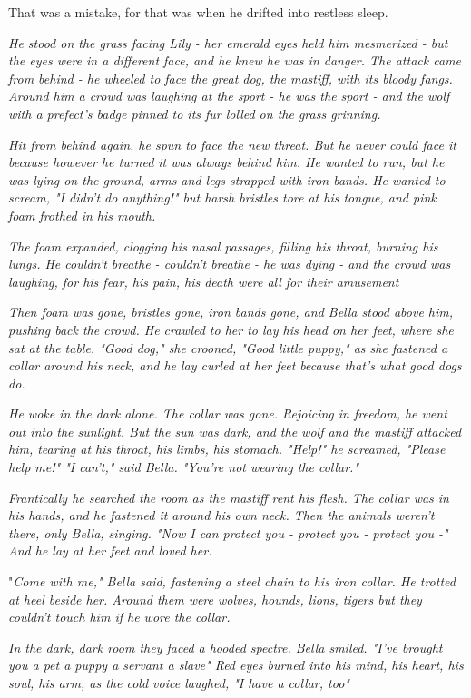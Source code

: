 That was a mistake, for that was when he drifted into restless sleep.

\sbreak

\emph{He stood on the grass facing Lily - her emerald eyes held him mesmerized - but the eyes were in a different face, and he knew he was in danger. The attack came from behind - he wheeled to face the great dog, the mastiff, with its bloody fangs. Around him a crowd was laughing at the sport - he was the sport - and the wolf with a prefect's badge pinned to its fur lolled on the grass grinning.}

\emph{Hit from behind again, he spun to face the new threat. But he never could face it because however he turned it was always behind him. He wanted to run, but he was lying on the ground, arms and legs strapped with iron bands. He wanted to scream, "I didn't do anything!" but harsh bristles tore at his tongue, and pink foam frothed in his mouth.}

\emph{The foam expanded, clogging his nasal passages, filling his throat, burning his lungs. He couldn't breathe - couldn't breathe - he was dying - and the crowd was laughing, for his fear, his pain, his death were all for their amusement{\el}}

\emph{Then foam was gone, bristles gone, iron bands gone, and Bella stood above him, pushing back the crowd. He crawled to her to lay his head on her feet, where she sat at the table. "Good dog," she crooned, "Good little puppy," as she fastened a collar around his neck, and he lay curled at her feet because that's what good dogs do.}

\emph{He woke in the dark alone. The collar was gone. Rejoicing in freedom, he went out into the sunlight. But the sun was dark, and the wolf and the mastiff attacked him, tearing at his throat, his limbs, his stomach. "Help!" he screamed, "Please help me!" "I can't," said Bella. "You're not wearing the collar."}

\emph{Frantically he searched the room as the mastiff rent his flesh. The collar was in his hands, and he fastened it around his own neck. Then the animals weren't there, only Bella, singing. "Now I can protect you - protect you - protect you -" And he lay at her feet and loved her.}

"\emph{Come with me," Bella said, fastening a steel chain to his iron collar. He trotted at heel beside her. Around them were wolves, hounds, lions, tigers{\el} but they couldn't touch him if he wore the collar.}

\emph{In the dark, dark room they faced a hooded spectre. Bella smiled. "I've brought you a pet{\el} a puppy{\el} a servant{\el} a slave{\el}" Red eyes burned into his mind, his heart, his soul, his arm, as the cold voice laughed, "I have a collar, too{\el}"}

